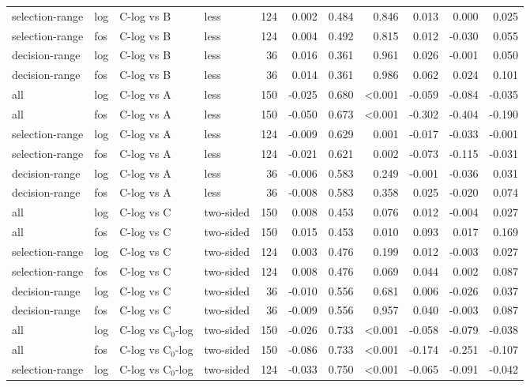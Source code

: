 \begin{longtable}{llllrrrrrrr}
selection-range & log & C-log vs B & less & 124 & 0.002 & 0.484 & 0.846 & 0.013 & 0.000 & 0.025 \\
selection-range & fos & C-log vs B & less & 124 & 0.004 & 0.492 & 0.815 & 0.012 & -0.030 & 0.055 \\
decision-range & log & C-log vs B & less & 36 & 0.016 & 0.361 & 0.961 & 0.026 & -0.001 & 0.050 \\
decision-range & fos & C-log vs B & less & 36 & 0.014 & 0.361 & 0.986 & 0.062 & 0.024 & 0.101 \\
all & log & C-log vs A & less & 150 & -0.025 & 0.680 & <0.001 & -0.059 & -0.084 & -0.035 \\
all & fos & C-log vs A & less & 150 & -0.050 & 0.673 & <0.001 & -0.302 & -0.404 & -0.190 \\
selection-range & log & C-log vs A & less & 124 & -0.009 & 0.629 & 0.001 & -0.017 & -0.033 & -0.001 \\
selection-range & fos & C-log vs A & less & 124 & -0.021 & 0.621 & 0.002 & -0.073 & -0.115 & -0.031 \\
decision-range & log & C-log vs A & less & 36 & -0.006 & 0.583 & 0.249 & -0.001 & -0.036 & 0.031 \\
decision-range & fos & C-log vs A & less & 36 & -0.008 & 0.583 & 0.358 & 0.025 & -0.020 & 0.074 \\
all & log & C-log vs C & two-sided & 150 & 0.008 & 0.453 & 0.076 & 0.012 & -0.004 & 0.027 \\
all & fos & C-log vs C & two-sided & 150 & 0.015 & 0.453 & 0.010 & 0.093 & 0.017 & 0.169 \\
selection-range & log & C-log vs C & two-sided & 124 & 0.003 & 0.476 & 0.199 & 0.012 & -0.003 & 0.027 \\
selection-range & fos & C-log vs C & two-sided & 124 & 0.008 & 0.476 & 0.069 & 0.044 & 0.002 & 0.087 \\
decision-range & log & C-log vs C & two-sided & 36 & -0.010 & 0.556 & 0.681 & 0.006 & -0.026 & 0.037 \\
decision-range & fos & C-log vs C & two-sided & 36 & -0.009 & 0.556 & 0.957 & 0.040 & -0.003 & 0.087 \\
all & log & C-log vs C$_0$-log & two-sided & 150 & -0.026 & 0.733 & <0.001 & -0.058 & -0.079 & -0.038 \\
all & fos & C-log vs C$_0$-log & two-sided & 150 & -0.086 & 0.733 & <0.001 & -0.174 & -0.251 & -0.107 \\
selection-range & log & C-log vs C$_0$-log & two-sided & 124 & -0.033 & 0.750 & <0.001 & -0.065 & -0.091 & -0.042 \\

\end{longtable}
